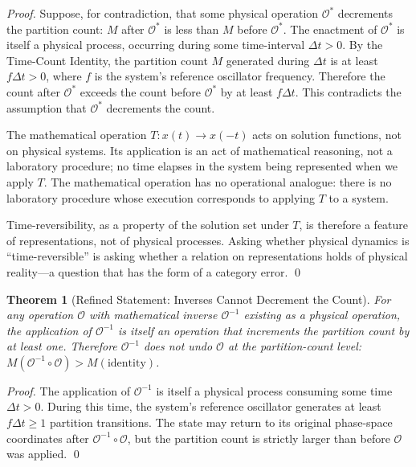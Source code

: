 \documentclass[twocolumn,10pt,a4paper]{article}
\newtheorem{theorem}{Theorem}[section]
\theoremstyle{definition}
\theoremstyle{remark}
\newcommand{\Mcount}{M}
\newcommand{\Operation}{\mathcal{O}}
\begin{document}
\begin{proof}
Suppose, for contradiction, that some physical operation $\Operation^*$ decrements the partition count: $\Mcount$ after $\Operation^*$ is less than $\Mcount$ before $\Operation^*$. The enactment of $\Operation^*$ is itself a physical process, occurring during some time-interval $\Delta t > 0$. By the Time-Count Identity, the partition count $\Mcount$ generated during $\Delta t$ is at least $f \Delta t > 0$, where $f$ is the system's reference oscillator frequency. Therefore the count after $\Operation^*$ exceeds the count before $\Operation^*$ by at least $f \Delta t$. This contradicts the assumption that $\Operation^*$ decrements the count.

The mathematical operation $T: x(t) \to x(-t)$ acts on solution functions, not on physical systems. Its application is an act of mathematical reasoning, not a laboratory procedure; no time elapses in the system being represented when we apply $T$. The mathematical operation has no operational analogue: there is no laboratory procedure whose execution corresponds to applying $T$ to a system.

Time-reversibility, as a property of the solution set under $T$, is therefore a feature of representations, not of physical processes. Asking whether physical dynamics is ``time-reversible'' is asking whether a relation on representations holds of physical reality---a question that has the form of a category error. \qed
\end{proof}

\begin{theorem}[Refined Statement: Inverses Cannot Decrement the Count]
\label{thm:refined-inverse}
For any operation $\Operation$ with mathematical inverse $\Operation^{-1}$ existing as a physical operation, the application of $\Operation^{-1}$ is itself an operation that increments the partition count by at least one. Therefore $\Operation^{-1}$ does not undo $\Operation$ at the partition-count level: $\Mcount(\Operation^{-1} \circ \Operation) > \Mcount(\mathrm{identity})$.
\end{theorem}

\begin{proof}
The application of $\Operation^{-1}$ is itself a physical process consuming some time $\Delta t > 0$. During this time, the system's reference oscillator generates at least $f \Delta t \geq 1$ partition transitions. The state may return to its original phase-space coordinates after $\Operation^{-1} \circ \Operation$, but the partition count is strictly larger than before $\Operation$ was applied. \qed
\end{proof}
\end{document}
